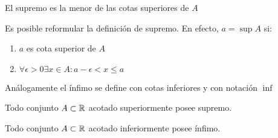     \begin{obs}
        El supremo es la menor de las cotas superiores de $A$
    \end{obs}

    \begin{obs}
        Es posible reformular la definición de supremo. En efecto, $a=\sup A$ si:
        \begin{enumerate}
            \item $a$ es cota superior de $A$

            \item $\forall\epsilon>0\exists x\in A:a-\epsilon<x\leq a$

        \end{enumerate}
    \end{obs}

    \begin{defn}[Ínfimo]
        Análogamente el ínfimo se define con cotas inferiores y con notación $\inf$
    \end{defn}
    \begin{defn}
        Todo conjunto $A\subset\mathbb{R}$ acotado superiormente posee supremo.
    \end{defn}
    \begin{obs}
        Todo conjunto $A\subset\mathbb{R}$ acotado inferiormente posee ínfimo.
    \end{obs}

    

